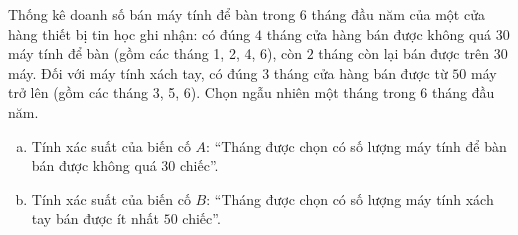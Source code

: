 \begin{bt}%
Thống kê doanh số bán máy tính để bàn trong $6$ tháng đầu năm của một cửa hàng thiết bị tin học ghi nhận: có đúng $4$ tháng cửa hàng bán được không quá $30$ máy tính để bàn (gồm các tháng 1, 2, 4, 6), còn $2$ tháng còn lại bán được trên $30$ máy. Đối với máy tính xách tay, có đúng $3$ tháng cửa hàng bán được từ $50$ máy trở lên (gồm các tháng 3, 5, 6). Chọn ngẫu nhiên một tháng trong $6$ tháng đầu năm.
\begin{enumerate}[a)]
    \item Tính xác suất của biến cố $A$: ``Tháng được chọn có số lượng máy tính để bàn bán được không quá $30$ chiếc''.
    \item Tính xác suất của biến cố $B$: ``Tháng được chọn có số lượng máy tính xách tay bán được ít nhất $50$ chiếc''.
\end{enumerate}
\end{bt}

